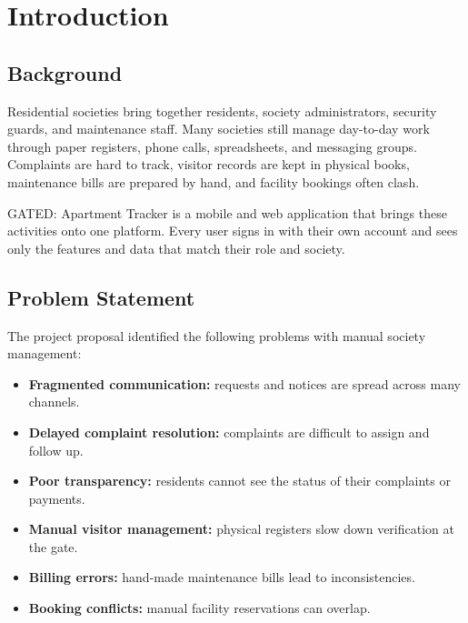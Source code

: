 \documentclass{tietreport}
\author{%
  \texttt{1024030101} Khushi Dangi \\
  \texttt{1024030115} Geetika Parakh \\
  \texttt{1024030121} Ridham Sharma \\
  \texttt{1024030937} Harnoor Singh
}
\renewcommand{\_}{\textunderscore\allowbreak}
\begin{document}
\maketitle

\tableofcontents

\newpage


\section{Introduction}

\subsection{Background}

Residential societies bring together residents, society administrators,
security guards, and maintenance staff. Many societies still manage
day-to-day work through paper registers, phone calls, spreadsheets, and
messaging groups. Complaints are hard to track, visitor records are kept in
physical books, maintenance bills are prepared by hand, and facility bookings
often clash.

GATED: Apartment Tracker is a mobile and web application that brings these
activities onto one platform. Every user signs in with their own account and
sees only the features and data that match their role and society.

\subsection{Problem Statement}

The project proposal identified the following problems with manual society
management:

\begin{itemize}
  \item \textbf{Fragmented communication:} requests and notices are spread
  across many channels.
  \item \textbf{Delayed complaint resolution:} complaints are difficult to
  assign and follow up.
  \item \textbf{Poor transparency:} residents cannot see the status of their
  complaints or payments.
  \item \textbf{Manual visitor management:} physical registers slow down
  verification at the gate.
  \item \textbf{Billing errors:} hand-made maintenance bills lead to
  inconsistencies.
  \item \textbf{Booking conflicts:} manual facility reservations can overlap.
\end{itemize}
\end{document}

